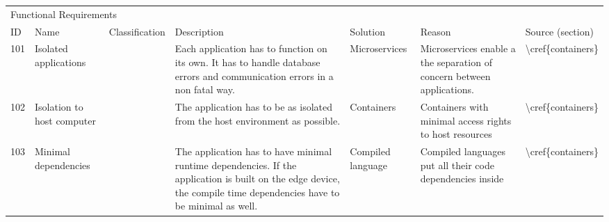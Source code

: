 \begin{table}[]
\begin{tabular}{lllllll}
\multicolumn{7}{l}{Functional Requirements}                                                                                                                                                                                                                                                                                                                                                                                                                                                                                                                  \\
ID  & Name                                    & Classification & Description                                                                                                                                                                                & Solution                 & Reason                                                                                                                                                                                                                         & Source (section)                   \\ \hline
101 & Isolated applications                   &                & Each application has to function on its own. It has to handle database errors and communication errors in a non fatal way.                                                                 & Microservices            & Microservices enable a the separation of concern between applications.                                                                                                                                                         & \textbackslash{}cref\{containers\} \\
102 & Isolation to host computer              &                & The application has to be as isolated from the host environment as possible.                                                                                                               & Containers               & Containers with minimal access rights to host resources                                                                                                                                                                        & \textbackslash{}cref\{containers\} \\
103 & Minimal dependencies                    &                & The application has to have minimal runtime dependencies. If the application is built on the edge device, the compile time dependencies have to be minimal as well.                        & Compiled language        & Compiled languages put all their code dependencies inside                                                                                                                                                                      & \textbackslash{}cref\{containers\} \\

\end{tabular}
\end{table}
